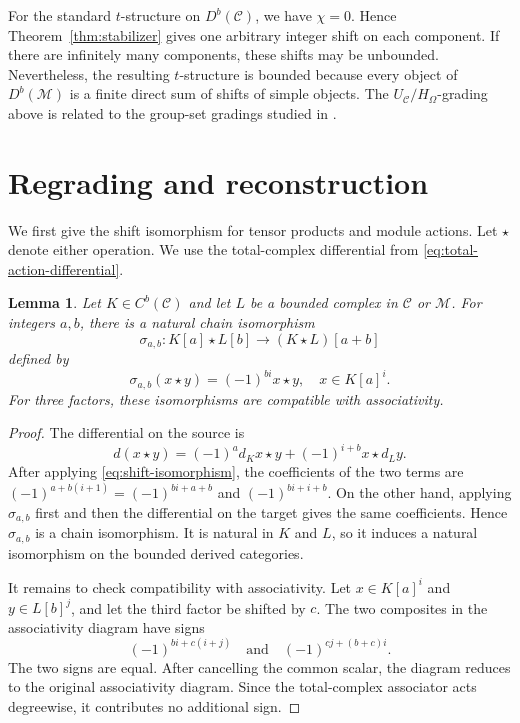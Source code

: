 \documentclass[11pt]{amsart}
\newcommand{\C}{\mathcal C}
\newcommand{\M}{\mathcal M}
\newtheorem{lemma}[theorem]{Lemma}
\theoremstyle{definition}
\theoremstyle{remark}
\theoremstyle{plain}
\begin{document}
For the standard $t$-structure on $D^b(\C)$, we have $\chi=0$. Hence Theorem~\ref{thm:stabilizer} gives one arbitrary integer shift on each component. If there are infinitely many components, these shifts may be unbounded. Nevertheless, the resulting $t$-structure is bounded because every object of $D^b(\M)$ is a finite direct sum of shifts of simple objects. The $U_{\C}/H_\Omega$-grading above is related to the group-set gradings studied in \cite{Galindo,GalindoGraded,MeirMusicantov}.

\section{Regrading and reconstruction}\label{sec:reconstruction}


We first give the shift isomorphism for tensor products and module actions. Let $\star$ denote either operation. We use the total-complex differential from \eqref{eq:total-action-differential}.

\begin{lemma}\label{lem:shift-isomorphism}
Let $K\in C^b(\C)$ and let $L$ be a bounded complex in $\C$ or $\M$. For integers $a,b$, there is a natural chain isomorphism
\[
\sigma_{a,b}: K[a]\star L[b]\rightarrow(K\star L)[a+b]
\]
defined by
\begin{equation}\label{eq:shift-isomorphism}
\sigma_{a,b}(x\star y)=(-1)^{bi}x\star y,\quad x\in K[a]^i.
\end{equation}
For three factors, these isomorphisms are compatible with associativity.
\end{lemma}

\begin{proof}
The differential on the source is
\[
d(x\star y)=(-1)^a d_Kx\star y+(-1)^{i+b}x\star d_Ly.
\]
After applying \eqref{eq:shift-isomorphism}, the coefficients of the two terms are $(-1)^{a+b(i+1)}=(-1)^{bi+a+b}$ and $(-1)^{bi+i+b}$. On the other hand, applying $\sigma_{a,b}$ first and then the differential on the target gives the same coefficients. Hence $\sigma_{a,b}$ is a chain isomorphism. It is natural in $K$ and $L$, so it induces a natural isomorphism on the bounded derived categories.

It remains to check compatibility with associativity. Let $x\in K[a]^i$ and $y\in L[b]^j$, and let the third factor be shifted by $c$. The two composites in the associativity diagram have signs
\[
(-1)^{bi+c(i+j)}\quad\text{and}\quad(-1)^{cj+(b+c)i}.
\]
The two signs are equal. After cancelling the common scalar, the diagram reduces to the original associativity diagram. Since the total-complex associator acts degreewise, it contributes no additional sign.
\end{proof}
\end{document}
